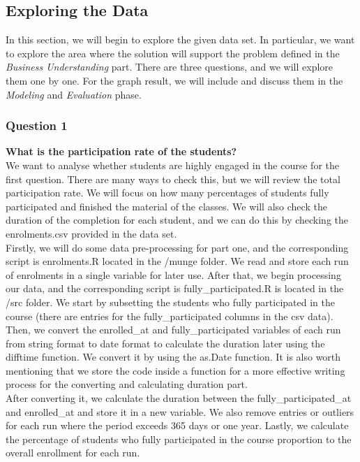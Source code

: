 \documentclass[12pt,]{article}
\begin{document}
\hypertarget{exploring-the-data}{%
\subsection{Exploring the Data}\label{exploring-the-data}}

In this section, we will begin to explore the given data set. In
particular, we want to explore the area where the solution will support
the problem defined in the \emph{Business Understanding} part. There are
three questions, and we will explore them one by one. For the graph
result, we will include and discuss them in the \emph{Modeling} and
\emph{Evaluation} phase.

\hypertarget{question-1}{%
\subsubsection{Question 1}\label{question-1}}

\textbf{What is the participation rate of the students?}\\
\hfill\break We want to analyse whether students are highly engaged in
the course for the first question. There are many ways to check this,
but we will review the total participation rate. We will focus on how
many percentages of students fully participated and finished the
material of the classes. We will also check the duration of the
completion for each student, and we can do this by checking the
enrolments.csv provided in the data set.\\
\hfill\break Firstly, we will do some data pre-processing for part one,
and the corresponding script is enrolments.R located in the /munge
folder. We read and store each run of enrolments in a single variable
for later use. After that, we begin processing our data, and the
corresponding script is fully\_participated.R is located in the /src
folder. We start by subsetting the students who fully participated in
the course (there are entries for the fully\_participated columns in the
csv data). Then, we convert the enrolled\_at and fully\_participated
variables of each run from string format to date format to calculate the
duration later using the difftime function. We convert it by using the
as.Date function. It is also worth mentioning that we store the code
inside a function for a more effective writing process for the
converting and calculating duration part.\\
\hfill\break After converting it, we calculate the duration between the
fully\_participated\_at and enrolled\_at and store it in a new variable.
We also remove entries or outliers for each run where the period exceeds
365 days or one year. Lastly, we calculate the percentage of students
who fully participated in the course proportion to the overall
enrollment for each run.
\end{document}
